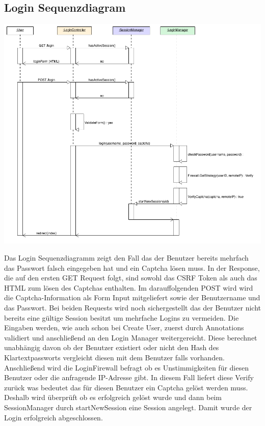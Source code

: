 \documentclass[12pt,DIV14,BCOR10mm,a4paper,twoside,parskip=half-,headsepline,headinclude,english,ngerman,bibliography=totocnumbered]{scrreprt}
\begin{document}
\subsection{Login Sequenzdiagram}
\includegraphics[width=0.70\paperwidth]{resources/loginseq_diagram.png}

Das Login Sequenzdiagramm zeigt den Fall das der Benutzer bereits mehrfach das Passwort falsch eingegeben hat und ein Captcha lösen muss. In der Response, die auf den ersten GET Request folgt, sind sowohl das CSRF Token als auch das HTML zum lösen des Captchas enthalten. Im darauffolgenden POST wird wird die Captcha-Information als Form Input mitgeliefert sowie der Benutzername und das Passwort. Bei beiden Requests wird noch sichergestellt das der Benutzer nicht bereits eine gültige Session besitzt um mehrfache Logins zu vermeiden. Die Eingaben werden, wie auch schon bei Create User, zuerst durch Annotations validiert und anschließend an den Login Manager weitergereicht. Diese berechnet unabhängig davon ob der Benutzer existiert oder nicht den Hash des Klartextpassworts vergleicht diesen mit dem Benutzer falls vorhanden. Anschließend wird die LoginFirewall befragt ob es Unstimmigkeiten für diesen Benutzer oder die anfragende IP-Adresse gibt. In diesem Fall liefert diese Verify zurück was bedeutet das für diesen Benutzer ein Captcha gelöst werden muss. Deshalb wird überprüft ob es erfolgreich gelöst wurde und dann beim SessionManager durch startNewSession eine Session angelegt. Damit wurde der Login erfolgreich abgeschlossen.
\end{document}
